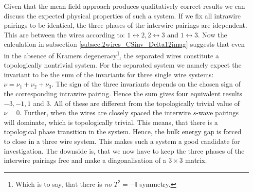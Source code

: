 Given that the mean field approach produces qualitatively correct results we can discuss the expected physical properties of such a system. If we fix all intrawire pairings to be identical, the three phases of the interwire pairings are idependent. This are between the wires according to: $1 \leftrightarrow 2, 2 \leftrightarrow 3$ and $1 \leftrightarrow 3$. Now the calculation in subsection \ref{subsec.2wires_CSinv_Delta12imag} suggests that even in the absence of Kramers degeneracy\footnote{Which is to say, that there is \textit{no} $T^2 = -\mathbb{I}$ symmetry.}, the separated wires constitute a topologically nontrivial system. For the separated system we namely expect the invariant to be the sum of the invariants for three single wire systems: $\nu = \nu_1 + \nu_2 + \nu_3$. The sign of the three invariants depends on the chosen sign of the corresponding intrawire pairing. Hence the sum gives four equivalent results $-3, -1, 1$ and $3$. All of these are different from the topologically trivial value of $\nu = 0$. Further, when the wires are closely spaced the interwire $s$-wave pairings will dominate, which is topologically trivial. This means, that there is a topological phase transition in the system. Hence, the bulk energy gap is forced to close in a three wire system. This makes such a system a good candidate for investigation. The downside is, that we now have to keep the three phases of the interwire pairings free and make a diagonalisation of a $3 \times 3$ matrix.  


